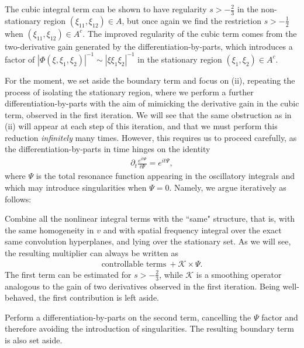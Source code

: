 \documentclass[a4paper,
11pt,  reqno]{amsart}
\newcommand{\5}{\textup{V}}
\newcommand{\noi}{\noindent}
\theoremstyle{remark}
\numberwithin{equation}{section}
\numberwithin{theorem}{section}
\begin{document}
\smallskip
\noi{\rm(ii)} The cubic integral term can be shown to have regularity $s>-\frac23$ in the non-stationary region $(\xi_{11}, \xi_{12})\in A$, but once again we find the restriction $s>-\frac12$ when $(\xi_{11}, \xi_{12})\in A^c$.
The improved regularity of the cubic term comes from the two-derivative gain generated by the differentiation-by-parts, which introduces a factor of $|\Phi(\xi,\xi_1, \xi_2)|^{-1} \sim |\xi\xi_1\xi_2|^{-1}$ in the stationary region $(\xi_1,\xi_2)\in A^c$.


\medskip

For the moment, we set aside the boundary term and focus on (ii), repeating the process of isolating the stationary region, where we perform a further differentiation-by-parts with the aim of mimicking the derivative gain in the cubic term, observed in the first iteration. We will see that the same obstruction as in (ii) will appear at each step of this iteration, and that we must perform this reduction \textit{infinitely} many times. 
However, this requires us to proceed carefully, as the differentiation-by-parts in time hinges on the identity
\begin{align}
\label{exp}
\partial_t\frac{e^{it\Psi}}{i\Psi} = {e^{it\Psi}},
\end{align}
where $\Psi$ is the total resonance function appearing in the oscillatory integrals and which may introduce singularities when $\Psi=0$.
Namely, we argue iteratively as follows:



    \smallskip
\noi{\bf Step 1.}
    Combine all the nonlinear integral terms with the ``same" structure, that is,
with the same homogeneity in $v$ and with spatial frequency integral over the exact same convolution hyperplanes,  and lying over the stationary set. 
As we will see, the resulting multiplier can always be written as
\begin{align}
\text{controllable terms} 
\ + \mathcal{K}\times \Psi
.
\end{align}
The first term can be estimated for $s>-\frac23$, while  $\mathcal{K}$ is a smoothing operator analogous to the gain of two derivatives observed in the first iteration. Being well-behaved, the first contribution is left aside.

 
    \smallskip
\noi{\bf Step 2.}
    Perform a differentiation-by-parts on the second term, cancelling the $\Psi$ factor and therefore avoiding the introduction of singularities. The resulting boundary term is also set aside.
\end{document}
